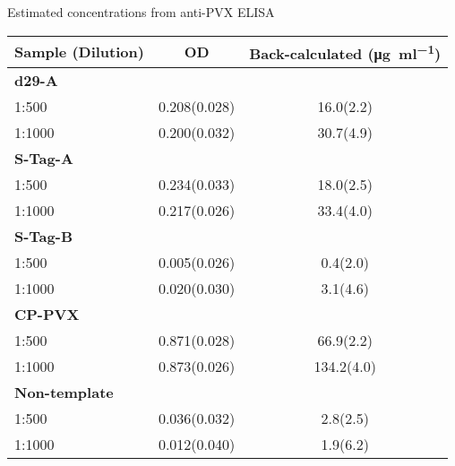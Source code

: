 \begin{supptable}[ht]
    \centering
    \caption{Estimated concentrations from anti-PVX ELISA}
    \label{tab:sample_values_elisa_anti_pvx}
    \begin{tabular}{
        l
        S[table-format=1.3(2),uncertainty-mode=separate]
        S[table-format=3.1(1),uncertainty-mode=separate]
    }
    \toprule
    {\textbf{Sample (Dilution)}} &
    {\textbf{OD}} &
    {\textbf{Back-calculated (\si{\micro\gram\per\milli\litre})}} \\
    \midrule
    \textbf{d29-A} \\
    1:500 & 0.208(0.028) & 16.0(2.2) \\
    1:1000 & 0.200(0.032) & 30.7(4.9) \\
    \textbf{S-Tag-A} \\
    1:500 & 0.234(0.033) & 18.0(2.5) \\
    1:1000 & 0.217(0.026) & 33.4(4.0) \\
    \textbf{S-Tag-B} \\
    1:500 & 0.005(0.026) & 0.4(2.0) \\
    1:1000 & 0.020(0.030) & 3.1(4.6) \\
    \textbf{CP-PVX} \\
    1:500 & 0.871(0.028) & 66.9(2.2) \\
    1:1000 & 0.873(0.026) & 134.2(4.0) \\
    \textbf{Non-template} \\
    1:500 & 0.036(0.032) & 2.8(2.5) \\
    1:1000 & 0.012(0.040) & 1.9(6.2) \\
    \bottomrule
    \end{tabular}
\end{supptable}

